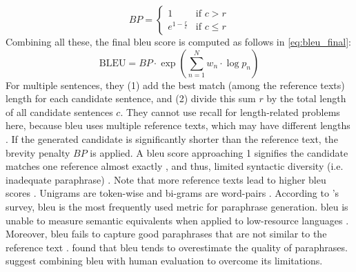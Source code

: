 \begin{equation}
    BP = \begin{cases}
        1 & \text{if } c > r \\
        e^{1 - \frac{r}{c}} & \text{if } c \leq r
    \end{cases}
\label{eq:bleu_brevity_penalty}
\end{equation}
Combining all these, the final \ac{bleu} score is computed as follows in \autoref{eq:bleu_final}:
\begin{equation}
    \text{BLEU} = BP \cdot \exp\left(\sum_{n=1}^{N} w_n \cdot \log p_n\right)
\label{eq:bleu_final}
\end{equation}
For multiple sentences, they (1) add the best match (among the reference texts) length for each candidate sentence, 
and (2) divide this sum $r$ by the total length of all candidate sentences $c$. 
They cannot use recall for length-related problems here, 
because \ac{bleu} uses multiple reference texts, which may have different lengths \citep{papineni_bleu_2001,banerjee_METEOR_2005}.
If the generated candidate is significantly shorter than the reference text, the brevity penalty $BP$ is applied.
A \ac{bleu} score approaching 1 signifies the candidate matches one reference almost exactly \citep{papineni_bleu_2001}, 
and thus, limited syntactic diversity (i.e. inadequate paraphrase) \citep{kurt_pehlivanoglu_comparative_2024}.
Note that more reference texts lead to higher \ac{bleu} scores \citep{papineni_bleu_2001}.
Unigrams are token-wise and bi-grams are word-pairs \citet{palivela_optimization_2021}.
According to \citet{zhou_paraphrase_2021}'s survey, \ac{bleu} is the most frequently used metric for paraphrase generation.
\ac{bleu} is unable to measure semantic equivalents \citep{kurt_pehlivanoglu_comparative_2024,zhou_paraphrase_2021} 
when applied to low-resource languages \citep{zhou_paraphrase_2021}.
Moreover, \ac{bleu} fails to capture good paraphrases that are not similar to the reference text \citep{zhou_paraphrase_2021}.
\citet{kurt_pehlivanoglu_comparative_2024} found that \ac{bleu} tends to overestimate the quality of paraphrases.
\citet{zhou_paraphrase_2021} suggest combining \ac{bleu} with human evaluation to overcome its limitations.


